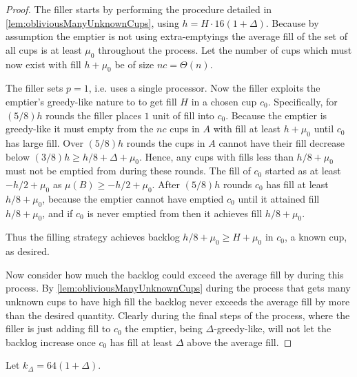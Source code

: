 \begin{proof}
  The filler starts by performing the procedure detailed in
  \cref{lem:obliviousManyUnknownCups}, using $h = H\cdot
  16(1+\Delta)$. Because by assumption the emptier is not using
  extra-emptyings the average fill of the set of all cups is at
  least $\mu_0$ throughout the process.
  Let the number of cups which must now exist with
  fill $h+\mu_0$ be of size $nc = \Theta(n)$.

  The filler sets $p=1$, i.e. uses a single processor. Now the
  filler exploits the emptier's greedy-like nature to to get fill
  $H$ in a chosen cup $c_0$. Specifically, for $(5/8)h$ rounds
  the filler places $1$ unit of fill into $c_0$. Because the
  emptier is greedy-like it must empty from the $nc$ cups in $A$
  with fill at least $h+\mu_0$ until $c_0$ has large fill. Over
  $(5/8)h$ rounds the cups in $A$ cannot have their fill decrease
  below $(3/8)h \ge h/8 + \Delta + \mu_0$. Hence, any cups with fills
  less than $h/8+\mu_0$ must not be emptied from during these rounds.
  The fill of $c_0$ started as at least $-h/2+\mu_0$ as $\mu(B) \ge
  -h/2+\mu_0$. After $(5/8)h$ rounds $c_0$ has fill at least
  $h/8+\mu_0$,
  because the emptier cannot have emptied $c_0$ until it attained
  fill $h/8+\mu_0$, and if $c_0$ is never emptied from then it achieves
  fill $h/8+\mu_0$.

  Thus the filling strategy achieves backlog $h/8 +\mu_0 \ge H +
  \mu_0$ in $c_0$, a known cup, as desired.

  Now consider how much the backlog could exceed the average fill
  by during this process. By \cref{lem:obliviousManyUnknownCups}
  during the process that gets many unknown cups to have high
  fill the backlog never exceeds the average fill by more than
  the desired quantity. Clearly during the final steps of the
  process, where the filler is just adding fill to $c_0$ the
  emptier, being $\Delta$-greedy-like, will not let the backlog
  increase once $c_0$ has fill at least $\Delta$ above the
  average fill.

\end{proof}
Let $k_\Delta = 64(1+\Delta)$.
